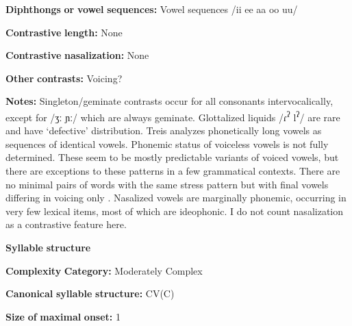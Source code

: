 \begin{styleBody}
\textbf{Diphthongs} \textbf{or} \textbf{vowel} \textbf{sequences:} Vowel sequences /ii ee aa oo uu/
\end{styleBody}

\begin{styleBody}
\textbf{Contrastive} \textbf{length:} None
\end{styleBody}

\begin{styleBody}
\textbf{Contrastive} \textbf{nasalization:} None
\end{styleBody}

\begin{styleBody}
\textbf{Other} \textbf{contrasts:} Voicing?
\end{styleBody}

\begin{styleBody}
\textbf{Notes:} Singleton/geminate contrasts occur for all consonants intervocalically, except for /ʒː ɲː/ which are always geminate. Glottalized liquids /ɾ\textsuperscript{ʔ} l\textsuperscript{ʔ}/ are rare and have ‘defective’ distribution. Treis analyzes phonetically long vowels as sequences of identical vowels. Phonemic status of voiceless vowels is not fully determined. These seem to be mostly predictable variants of voiced vowels, but there are exceptions to these patterns in a few grammatical contexts. There are no minimal pairs of words with the same stress pattern but with final vowels differing in voicing only \citep[20-22]{Treis2008}. Nasalized vowels are marginally phonemic, occurring in very few lexical items, most of which are ideophonic. I do not count nasalization as a contrastive feature here.
\end{styleBody}

\begin{styleBody}
\textbf{Syllable} \textbf{structure}
\end{styleBody}

\begin{styleBody}
\textbf{Complexity} \textbf{Category:} Moderately Complex
\end{styleBody}

\begin{styleBody}
\textbf{Canonical} \textbf{syllable} \textbf{structure:} CV(C) \citep[41]{Treis2008}
\end{styleBody}

\begin{styleBody}
\textbf{Size} \textbf{of} \textbf{maximal} \textbf{onset:} 1
\end{styleBody}

